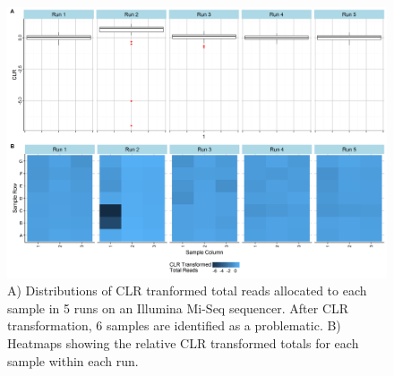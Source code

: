 \documentclass{article}\usepackage[]{graphicx}\usepackage[]{color}
\theoremstyle{definition}
\begin{document}
\begin{figure}
\includegraphics[scale=.5]{./Figures/IO_Repro_Combined_CLR}
\caption{A) Distributions of CLR tranformed total reads allocated to each sample in 5 runs on an Illumina Mi-Seq sequencer. After CLR transformation, 6 samples are identified as a problematic. B) Heatmaps showing the relative CLR transformed totals for each sample within each run.}
\label{clrFig}
\end{figure}

\newpage

\printbibliography
\end{document}
